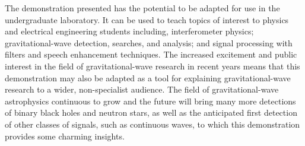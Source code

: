 \documentclass[paper-main.tex]{subfiles}
\begin{document}
The demonstration presented has the potential to be adapted for use in the undergraduate laboratory.
It can be used to teach topics of interest to physics and electrical engineering students including, interferometer physics; gravitational-wave detection, searches, and analysis; and signal processing with filters and speech enhancement techniques. 
The increased excitement and public interest in the field of gravitational-wave research in recent years means that this demonstration may also be adapted as a tool for explaining gravitational-wave research to a wider, non-specialist audience. 
The field of gravitational-wave astrophysics continuous to grow and the future will bring many more detections of binary black holes and neutron stars, as well as the anticipated first detection of other classes of signals, such as continuous waves, to which this demonstration provides some charming insights. 




\end{document}
